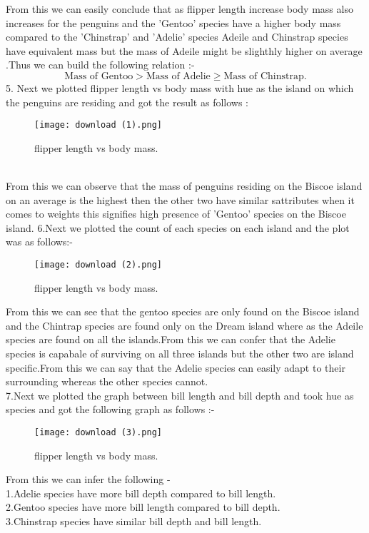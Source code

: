 \documentclass[12pt]{article}
\begin{document}
From this we can easily conclude that as flipper length increase body mass also increases for the penguins and the 'Gentoo' species have a higher body mass compared to the 'Chinstrap' and 'Adelie' species Adeile and Chinstrap species have equivalent mass but the mass of Adeile might be slighthly higher on average .Thus we can build the following relation :- 
\[
\text{Mass of Gentoo} > \text{Mass of Adelie} \geq \text{Mass of Chinstrap}.
\]
5. Next we plotted flipper length vs body mass with hue as the island on which the penguins are residing and got the result as follows :\\
\begin{figure}[H]
    \centering
    \texttt{[image: download (1).png]} 
    \caption{flipper length vs body mass.}
    \label{fig:example-image}
\end{figure}\\

From this we can observe that the mass of  penguins residing on the Biscoe island on an average is the highest then the other two have similar sattributes when it comes to weights this signifies high presence of 'Gentoo' species on the Biscoe island.
6.Next we plotted the count of each species on each island and the plot was as follows:-
\begin{figure}[H]
    \centering
    \texttt{[image: download (2).png]} 
    \caption{flipper length vs body mass.}
    \label{fig:example-image}
\end{figure}
From this we can see that the gentoo species are only found on the Biscoe island and the Chintrap species are found only on the Dream island where as the Adeile species are found on all the islands.From this we can confer that the Adelie species is capabale of surviving on all three islands but the other two are island specific.From this we can say that the Adelie species can easily adapt to their surrounding whereas the other species cannot.\\
7.Next we plotted the graph between bill length and bill depth and took hue as species and got the following graph as follows :-
\begin{figure}[H]
    \centering
    \texttt{[image: download (3).png]} 
    \caption{flipper length vs body mass.}
    \label{fig:example-image}
\end{figure}

From this we can infer  the following -\\
1.Adelie species have more bill depth compared to bill length.\\
2.Gentoo species have more bill length compared to bill depth.\\
3.Chinstrap species have similar bill depth and bill length.\\
\end{document}
